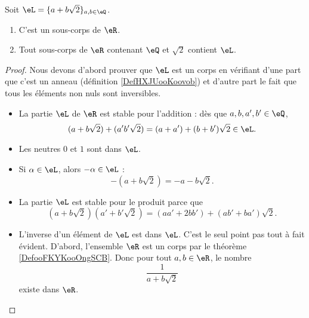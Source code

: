 \begin{proposition}
    Soit \( \eL=\{ a+b\sqrt{ 2 } \}_{a,b\in \eQ}\).
    \begin{enumerate}
        \item
            C'est un sous-corps de \( \eR\).
        \item   \label{ITEMooUSOAooZoBhla}
            Tout sous-corps de \( \eR\) contenant \( \eQ\) et \( \sqrt{ 2 }\) contient \( \eL\).
    \end{enumerate}
\end{proposition}

\begin{proof}
    Nous devons d'abord prouver que \( \eL\) est un corps en vérifiant d'une part que c'est un anneau (définition \ref{DefHXJUooKoovob}) et d'autre part le fait que tous les éléments non nuls sont inversibles.
    \begin{itemize}
        \item La partie \( \eL\) de \( \eR\) est stable pour l'addition : dès que \( a,b,a',b'\in \eQ\),
            \begin{equation}
                (a+b\sqrt{ 2 })+(a'b'\sqrt{ 2 })=(a+a')+(b+b')\sqrt{ 2 }\in \eL.
            \end{equation}
        \item
            Les neutres \( 0\) et \( 1\) sont dans \( \eL\).
        \item
            Si \( \alpha\in \eL\), alors \( -\alpha\in \eL\) :
            \begin{equation}
                -(a+b\sqrt{ 2 })=-a-b\sqrt{ 2 }.
            \end{equation}
        \item
            La partie \( \eL\) est stable pour le produit parce que
            \begin{equation}
                (a+b\sqrt{ 2 })(a'+b'\sqrt{ 2 })=(aa'+2bb')+(ab'+ba')\sqrt{ 2 }.
            \end{equation}
        \item
            L'inverse d'un élément de \( \eL\) est dans \( \eL\). C'est le seul point pas tout à fait évident. D'abord, l'ensemble \( \eR\) est un corps par le théorème \ref{DefooFKYKooOngSCB}. Donc pour tout \( a,b\in \eR\), le nombre
            \begin{equation}
                \frac{1}{ a+b\sqrt{ 2 } }
            \end{equation}
            existe dans \( \eR\).
            

\end{itemize}
\end{proof}
